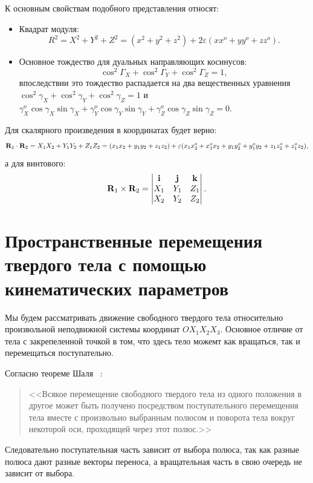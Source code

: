 К основным свойствам подобного представления относят:
\begin{itemize}
    \item Квадрат модуля:
        \begin{equation*}
            R^2 = X^2 + Y^2 + Z^2 = (x^2 + y^2 + z^2) + 2\varepsilon (x x^o + y y^o + z z^o).
        \end{equation*}
    \item Основное тождество для дуальных направляющих косинусов:
        \begin{equation*}
            \cos^2 \Gamma_X + \cos^2 \Gamma_Y + \cos^2 \Gamma_Z = 1,
        \end{equation*}
        впоследствии это тождество распадается на два вещественных уравнения $\cos^2 \gamma_X + \cos^2 \gamma_Y + \cos^2 \gamma_Z = 1$ и $\gamma_X^o \cos \gamma_X \sin \gamma_X + \gamma_Y^o \cos \gamma_Y \sin \gamma_Y + \gamma_Z^o \cos \gamma_Z \sin \gamma_Z = 0$.
\end{itemize}
Для скалярного произведения в координатах будет верно:
\begin{equation*}
    \vb{R}_1 \cdot \vb{R}_2 = X_1 X_2 + Y_1 Y_2 + Z_1 Z_2 = (x_1 x_2 + y_1 y_2 + z_1 z_2) + \varepsilon (x_1 x_2^o + x_1^o x_2 + y_1 y_2^o + y_1^o y_2 + z_1 z_2^o + z_1^o z_2),
\end{equation*}
а для винтового:
\begin{equation*}
    \vb{R}_1 \times \vb{R}_2 = \begin{vmatrix} \vb{i} & \vb{j} & \vb{k} \\ X_1 & Y_1 & Z_1 \\ X_2 & Y_2 & Z_2 \end{vmatrix}.
\end{equation*}

\section{Пространственные перемещения твердого тела с помощью кинематических параметров}

Мы будем рассматривать движение свободного твердого тела относительно произвольной неподвижной системы координат $O X_1 X_2 X_3$. Основное отличие от тела с закрепеленной точкой в том, что здесь тело можемт как вращаться, так и перемещаться поступательно.

Согласно теореме Шаля ~\cite{Chelnokov:2006}:
\begin{quote}
    <<Всякое перемещение свободного твердого тела из одного положения в другое может быть получено посредством поступательного перемещения тела вместе с произвольно выбранным полюсом и поворота тела вокруг некоторой оси, проходящей через этот полюс.>>
\end{quote}
Следовательно поступательная часть зависит от выбора полюса, так как разные полюса дают разные векторы переноса, а вращательная часть в свою очередь не зависит от выбора.


